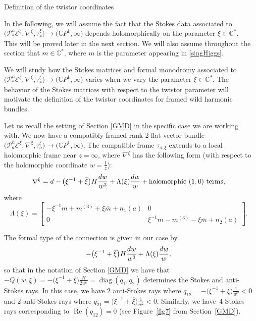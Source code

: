 \documentclass[11pt]{article}
\numberwithin{equation}{section}
\numberwithin{equation}{section}
\newcommand{\CP}{\mathbb{C}P^1}
\begin{document}
\begin{subsubsection} {Definition of the twistor coordinates}\label{deftwistcoords}

In the following, we will assume the fact that the Stokes data associated to $\bigl(\mathcal{P}^h_*\mathcal{E}^{\xi},\nabla^{\xi}, \tau_{*}^{\xi}\bigr)\to \bigl(\CP,\infty\bigr)$ depends holomorphically on the parameter $\xi \in \mathbb{C}^*$. This will be proved later in the next section. We will also assume throughout the section that $m\in \mathbb{C}^{*}$, where $m$ is the parameter appearing in \eqref{singHiggs}.

We will study how the Stokes matrices and formal monodromy associated to $\bigl(\mathcal{P}^h_*\mathcal{E}^{\xi},\nabla^{\xi}, \tau_{*}^{\xi}\bigr)\to \bigl(\CP,\infty\bigr)$ varies when we vary the parameter $\xi \in \mathbb{C}^*$. The behavior of the Stokes matrices with respect to the twistor parameter will motivate the definition of the twistor coordinates for framed wild harmonic bundles.

Let us recall the setting of Section \ref{GMD} in the specific case we are working with. We now have a compatibly framed rank 2 flat vector bundle $\bigl(\mathcal{P}^h_a\mathcal{E}^{\xi},\nabla^{\xi}, \tau_{a}^{\xi}\bigr)\to \bigl(\CP,\infty\bigr)$. The compatible frame $\tau_{a,\xi}$ extends to a local holomorphic frame near $z=\infty$, where $\nabla^{\xi}$ has the following form (with respect to the holomorphic coordinate $w=\frac1z$):
\begin{equation*}
 \nabla^{\xi}={\rm d} -\bigl(\xi^{-1}+\overline{\xi}\bigr)H\frac{{\rm d}w}{w^3}+\Lambda(\xi)\frac{{\rm d}w}{w} + \text{holomorphic $(1,0)$ terms},
\end{equation*}
where
\begin{equation}\label{formmon}
 \Lambda(\xi)=\begin{bmatrix}-\xi^{-1}m +m^{(3)}+\xi \overline{m} +n_1(a) & 0\\
 0& \xi^{-1}m -m^{(3)}-\xi \overline{m} +n_2(a)
 \end{bmatrix}.
\end{equation}

The formal type of the connection is given in our case by
\begin{equation}\label{formtype}
 -\bigl(\xi^{-1}+\overline{\xi}\bigr)H\frac{{\rm d}w}{w^3}+\Lambda(\xi)\frac{{\rm d}w}{w},
\end{equation}
so that in the notation of Section \ref{GMD} we have that $-Q(w,\xi)=-\bigl(\xi^{-1}+\overline{\xi}\bigr)\frac{H}{2w^2}=\operatorname{diag}(q_1,q_2)$ determines the Stokes and anti-Stokes rays. In this case, we have $2$ anti-Stokes rays where $q_{12}=-\bigl(\xi^{-1}+\overline{\xi}\bigr)\frac{1}{w^2}<0$ and $2$ anti-Stokes rays where $q_{21}=\bigl(\xi^{-1}+\overline{\xi}\bigr)\frac{1}{w^2}<0$. Similarly, we have~$4$ Stokes rays corresponding to $\operatorname{Re}(q_{12})=0$ (see Figure~\ref{fig7} from Section~\ref{GMD}).


\end{subsubsection}
\end{document}
